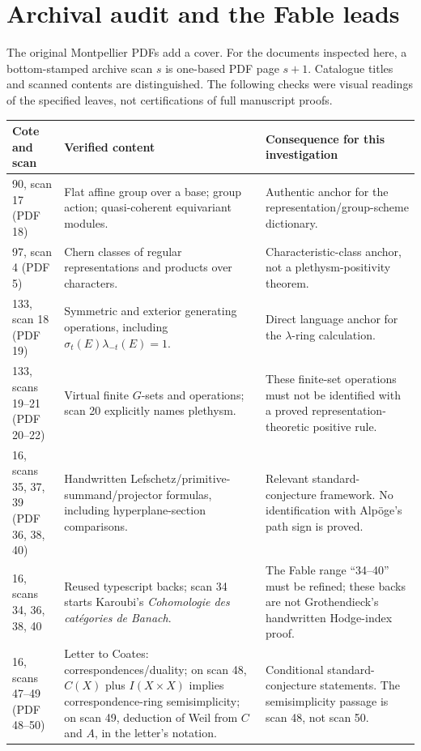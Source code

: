 \documentclass[11pt,a4paper]{article}
\theoremstyle{named}\newtheorem{finding}{Finding}[section]
\theoremstyle{definition}\newtheorem{definition}[finding]{Definition}
\theoremstyle{remark}\newtheorem{remark}[finding]{Remark}
\begin{document}
\section{Archival audit and the Fable leads}\label{sec:archive}
The original Montpellier PDFs add a cover. For the documents inspected here, a bottom-stamped archive scan $s$ is one-based PDF page $s+1$. Catalogue titles and scanned contents are distinguished. The following checks were visual readings of the specified leaves, not certifications of full manuscript proofs.

{\small\begin{longtable}{p{.19\linewidth}p{.36\linewidth}p{.37\linewidth}}
\toprule Cote and scan&Verified content&Consequence for this investigation\\\midrule\endhead
90, scan 17 (PDF 18)&Flat affine group over a base; group action; quasi-coherent equivariant modules.&Authentic anchor for the representation/group-scheme dictionary.\\
97, scan 4 (PDF 5)&Chern classes of regular representations and products over characters.&Characteristic-class anchor, not a plethysm-positivity theorem.\\
133, scan 18 (PDF 19)&Symmetric and exterior generating operations, including $\sigma_t(E)\lambda_{-t}(E)=1$.&Direct language anchor for the $\lambda$-ring calculation.\\
133, scans 19--21 (PDF 20--22)&Virtual finite $G$-sets and operations; scan 20 explicitly names plethysm.&These finite-set operations must not be identified with a proved representation-theoretic positive rule.\\
16, scans 35, 37, 39 (PDF 36, 38, 40)&Handwritten Lefschetz/primitive-summand/projector formulas, including hyperplane-section comparisons.&Relevant standard-conjecture framework. No identification with Alp\"oge's path sign is proved.\\
16, scans 34, 36, 38, 40&Reused typescript backs; scan 34 starts Karoubi's \emph{Cohomologie des cat\'egories de Banach}.&The Fable range ``34--40'' must be refined; these backs are not Grothendieck's handwritten Hodge-index proof.\\
16, scans 47--49 (PDF 48--50)&Letter to Coates: correspondences/duality; on scan 48, $C(X)$ plus $I(X\times X)$ implies correspondence-ring semisimplicity; on scan 49, deduction of Weil from $C$ and $A$, in the letter's notation.&Conditional standard-conjecture statements. The semisimplicity passage is scan 48, not scan 50.\\

\end{longtable}}
\end{document}
